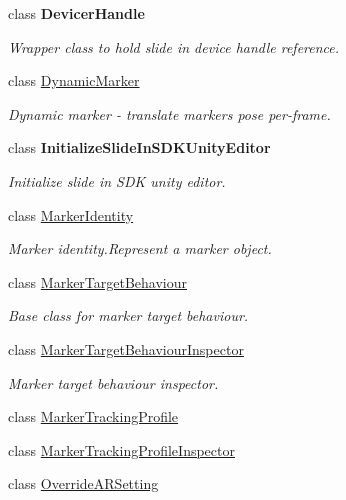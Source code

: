 \begin{DoxyCompactItemize}
class {\bfseries Devicer\+Handle}
\begin{DoxyCompactList}\small\item\em Wrapper class to hold slide in device handle reference. \end{DoxyCompactList}\item 
class \mbox{\hyperlink{class_ximmerse_1_1_slide_in_s_d_k_1_1_dynamic_marker}{Dynamic\+Marker}}
\begin{DoxyCompactList}\small\item\em Dynamic marker -\/ translate marker\textquotesingle{}s pose per-\/frame. ~\newline
\end{DoxyCompactList}\item 
class {\bfseries Initialize\+Slide\+In\+S\+D\+K\+Unity\+Editor}
\begin{DoxyCompactList}\small\item\em Initialize slide in S\+DK unity editor. \end{DoxyCompactList}\item 
class \mbox{\hyperlink{class_ximmerse_1_1_slide_in_s_d_k_1_1_marker_identity}{Marker\+Identity}}
\begin{DoxyCompactList}\small\item\em Marker identity.\+Represent a marker object. \end{DoxyCompactList}\item 
class \mbox{\hyperlink{class_ximmerse_1_1_slide_in_s_d_k_1_1_marker_target_behaviour}{Marker\+Target\+Behaviour}}
\begin{DoxyCompactList}\small\item\em Base class for marker target behaviour. \end{DoxyCompactList}\item 
class \mbox{\hyperlink{class_ximmerse_1_1_slide_in_s_d_k_1_1_marker_target_behaviour_inspector}{Marker\+Target\+Behaviour\+Inspector}}
\begin{DoxyCompactList}\small\item\em Marker target behaviour inspector. \end{DoxyCompactList}\item 
class \mbox{\hyperlink{class_ximmerse_1_1_slide_in_s_d_k_1_1_marker_tracking_profile}{Marker\+Tracking\+Profile}}
\item 
class \mbox{\hyperlink{class_ximmerse_1_1_slide_in_s_d_k_1_1_marker_tracking_profile_inspector}{Marker\+Tracking\+Profile\+Inspector}}
\item 
class \mbox{\hyperlink{class_ximmerse_1_1_slide_in_s_d_k_1_1_override_a_r_setting}{Override\+A\+R\+Setting}}

\end{DoxyCompactItemize}
